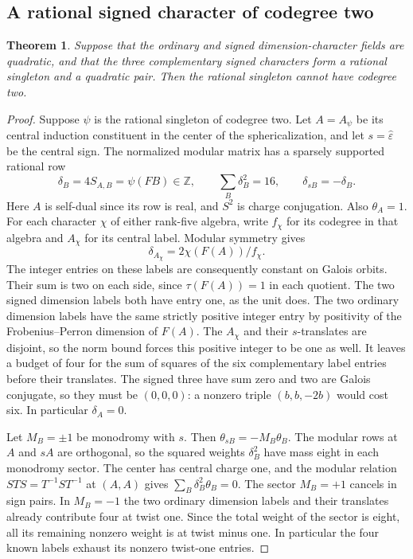 \documentclass[11pt,a4paper]{article}
\newtheorem{theorem}{Theorem}[section]
\numberwithin{equation}{section}
\begin{document}
\subsection{A rational signed character of codegree two}
\begin{theorem}\label{thm:no-signed-two}
Suppose that the ordinary and signed dimension-character fields are quadratic, and that the three complementary signed characters form a rational singleton and a quadratic pair. Then the rational singleton cannot have codegree two.
\end{theorem}
\begin{proof}
Suppose $\psi$ is the rational singleton of codegree two. Let $A=A_\psi$ be its central induction constituent in the center of the sphericalization, and let $s=\widehat\varepsilon$ be the central sign. The normalized modular matrix has a sparsely supported rational row
\[
 \delta_B=4S_{A,B}=\psi(FB)\in\mathbb Z,\qquad
 \sum_B\delta_B^2=16,\qquad \delta_{sB}=-\delta_B .
\]
Here $A$ is self-dual since its row is real, and $S^2$ is charge conjugation. Also $\theta_A=1$. For each character $\chi$ of either rank-five algebra, write $f_\chi$ for its codegree in that algebra and $A_\chi$ for its central label. Modular symmetry gives
\[
              \delta_{A_\chi}=2\chi(F(A))/f_\chi .
\]
The integer entries on these labels are consequently constant on Galois orbits. Their sum is two on each side, since $\tau(F(A))=1$ in each quotient. The two signed dimension labels both have entry one, as the unit does. The two ordinary dimension labels have the same strictly positive integer entry by positivity of the Frobenius--Perron dimension of $F(A)$. The $A_\chi$ and their $s$-translates are disjoint, so the norm bound forces this positive integer to be one as well. It leaves a budget of four for the sum of squares of the six complementary label entries before their translates. The signed three have sum zero and two are Galois conjugate, so they must be $(0,0,0)$: a nonzero triple $(b,b,-2b)$ would cost six. In particular $\delta_A=0$.

Let $M_B=\pm1$ be monodromy with $s$. Then $\theta_{sB}=-M_B\theta_B$. The modular rows at $A$ and $sA$ are orthogonal, so the squared weights $\delta_B^2$ have mass eight in each monodromy sector. The center has central charge one, and the modular relation $STS=T^{-1}ST^{-1}$ at $(A,A)$ gives $\sum_B\delta_B^2\theta_B=0$. The sector $M_B=+1$ cancels in sign pairs. In $M_B=-1$ the two ordinary dimension labels and their translates already contribute four at twist one. Since the total weight of the sector is eight, all its remaining nonzero weight is at twist minus one. In particular the four known labels exhaust its nonzero twist-one entries.


\end{proof}
\end{document}
